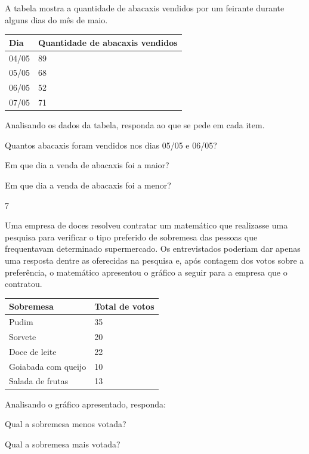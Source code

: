 \begin{multicols}{2}
{\begin{escolha}
{A tabela mostra a quantidade de abacaxis vendidos por um feirante
durante alguns dias do mês de maio.

\begin{longtable}[]{@{}ll@{}}
\toprule
Dia & Quantidade de abacaxis vendidos\tabularnewline
\midrule
\endhead
04/05 & 89\tabularnewline
05/05 & 68\tabularnewline
06/05 & 52\tabularnewline
07/05 & 71\tabularnewline
\bottomrule
\end{longtable}

Analisando os dados da tabela, responda ao que se pede em cada item.

\begin{escolha}
  \item
  Quantos abacaxis foram vendidos nos dias 05/05 e 06/05?

\item
  Em que dia a venda de abacaxis foi a maior?

\item
  Em que dia a venda de abacaxis foi a menor?
\end{escolha}

\num{7}

Uma empresa de doces resolveu contratar um matemático que realizasse uma
pesquisa para verificar o tipo preferido de sobremesa das pessoas que
frequentavam determinado supermercado. Os entrevistados poderiam dar
apenas uma resposta dentre as oferecidas na pesquisa e, após contagem dos
votos sobre a preferência, o matemático apresentou o gráfico a seguir
para a empresa que o contratou.

\begin{longtable}[]{@{}ll@{}}
\toprule
Sobremesa & Total de votos\tabularnewline
\midrule
\endhead
Pudim & 35\tabularnewline
Sorvete & 20\tabularnewline
Doce de leite & 22\tabularnewline
Goiabada com queijo & 10\tabularnewline
Salada de frutas & 13\tabularnewline
\bottomrule
\end{longtable}

Analisando o gráfico apresentado, responda:

\begin{escolha}

\item
  Qual a sobremesa menos votada?

\item
  Qual a sobremesa mais votada?


\end{escolha}}
\end{escolha}}
\end{multicols}
